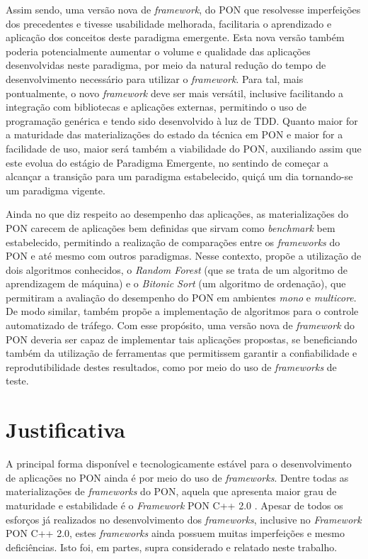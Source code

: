 Assim sendo, uma versão nova de \textit{framework}, do PON que resolvesse
imperfeições dos precedentes e tivesse usabilidade melhorada, facilitaria o
aprendizado e aplicação dos conceitos deste paradigma emergente. Esta nova
versão também poderia potencialmente aumentar o volume e qualidade das
aplicações desenvolvidas neste paradigma, por meio da natural redução do tempo
de desenvolvimento necessário para utilizar o \textit{framework}. Para tal, mais
pontualmente, o novo \textit{framework} deve ser mais versátil, inclusive
facilitando a integração com bibliotecas e aplicações externas, permitindo o uso
de programação genérica e tendo sido desenvolvido à luz de TDD. Quanto maior for
a maturidade das materializações do estado da técnica em PON e maior for a
facilidade de uso, maior será também a viabilidade do PON, auxiliando assim que
este evolua do estágio de Paradigma Emergente, no sentindo de começar a alcançar
a transição para um paradigma estabelecido, quiçá um dia tornando-se um
paradigma vigente.

Ainda no que diz respeito ao desempenho das aplicações, as materializações do
PON carecem de aplicações bem definidas que sirvam como \textit{benchmark} bem
estabelecido, permitindo a realização de comparações entre os
\textit{frameworks} do PON e até mesmo com outros paradigmas. Nesse contexto,
 propõe a utilização de dois algoritmos
conhecidos, o \textit{Random Forest} (que se trata de um algoritmo de
aprendizagem de máquina) e o \textit{Bitonic Sort} (um algoritmo de ordenação),
que permitiram a avaliação do desempenho do PON em ambientes \textit{mono} e
\textit{multicore}. De modo similar,  também propõe
a implementação de algoritmos para o controle automatizado de tráfego. Com esse propósito,
uma versão nova de \textit{framework} do PON deveria ser capaz de implementar
tais aplicações propostas, se beneficiando também da utilização de ferramentas
que permitissem garantir a confiabilidade e reprodutibilidade destes resultados,
como por meio do uso de \textit{frameworks} de teste.

\section{Justificativa}

A principal forma disponível e tecnologicamente estável para o desenvolvimento
de aplicações no PON ainda é por meio do uso de \textit{frameworks}. Dentre
todas as materializações de \textit{frameworks} do PON, aquela que apresenta
maior grau de maturidade e estabilidade é o \textit{Framework} PON C++ 2.0
\cite{ronszcka_2017}. Apesar de todos os esforços já realizados no
desenvolvimento dos \textit{frameworks}, inclusive no \textit{Framework} PON C++
2.0, estes \textit{frameworks} ainda possuem muitas imperfeições e mesmo
deficiências. Isto foi, em partes, supra considerado e relatado neste trabalho.

